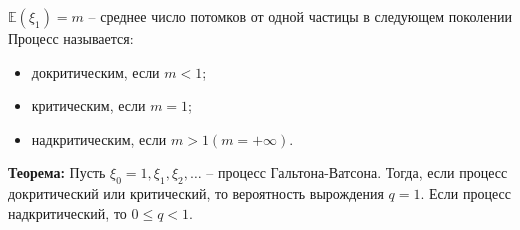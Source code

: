 \[\mathbb{E}(\xi_1) = m \text{ -- среднее число потомков от одной частицы в следующем поколении} \]
Процесс называется:
\begin{itemize}
	\item докритическим, если $m < 1$;
	\item критическим, если $m = 1$;
	\item надкритическим, если $m > 1(m = +\infty)$.
\end{itemize}

\textbf{Теорема:} Пусть $\xi_0 = 1, \xi_1, \xi_2, \ldots$ -- процесс Гальтона-Ватсона. Тогда, если процесс докритический или критический, то вероятность вырождения $q = 1$. Если процесс надкритический, то $0 \leqslant q < 1$.


